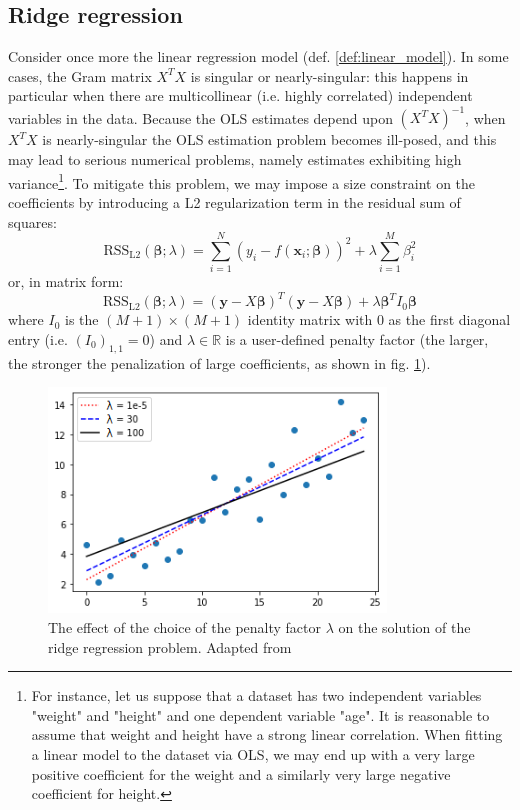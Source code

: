 \subsection{Ridge regression}
\label{sec:ridge}
Consider once more the linear regression model (def. \ref{def:linear_model}). In some cases, the Gram matrix $X^T X$ is singular or nearly-singular: this happens in particular when there are multicollinear (i.e. highly correlated) independent variables in the data. Because the OLS estimates depend upon $(X^T X)^{-1}$, when $X^T X$ is nearly-singular the OLS estimation problem becomes ill-posed, and this may lead to serious numerical problems, namely estimates exhibiting high variance\footnote{For instance, let us suppose that a dataset has two independent variables "weight" and "height" and one dependent variable "age". It is reasonable to assume that weight and height have a strong linear correlation. When fitting a linear model to the dataset via OLS, we may end up with a very large positive coefficient for the weight and a similarly very large negative coefficient for height.}.
To mitigate this problem, we may impose a size constraint on the coefficients by introducing a L2 regularization term in the residual sum of squares:
\begin{equation}
\text{RSS}_\text{L2}(\bm{\beta};\lambda) = \sum_{i=1}^N (y_i - f(\mathbf{x}_{i};\bm{\beta}))^2 + \lambda \sum_{i=1}^M \beta_i^2
\end{equation}
or, in matrix form:
\begin{equation}
\text{RSS}_\text{L2}(\bm{\beta};\lambda) = (\mathbf{y}-X\bm{\beta})^T(\mathbf{y}-X\bm{\beta}) + \lambda \bm{\beta}^T I_0 \bm{\beta}
\end{equation}
where $I_0$ is the $(M+1) \times (M+1)$ identity matrix with 0 as the first diagonal entry (i.e. $(I_0)_{1,1}=0$) and  $\lambda\in\mathbb{R}$ is a user-defined penalty factor (the larger, the stronger the penalization of large coefficients, as shown in fig. \ref{fig:ridge_penalty}).

\begin{figure}[hbt!]
    \centering
    \includegraphics[width=0.8\textwidth]{images/ridge_penalty}
    \caption[Choice of the penalty factor in RR]{The effect of the choice of the penalty factor $\lambda$ on the solution of the ridge regression problem. Adapted from \cite{ridge_penalty}}
    \label{fig:ridge_penalty}
\end{figure}

